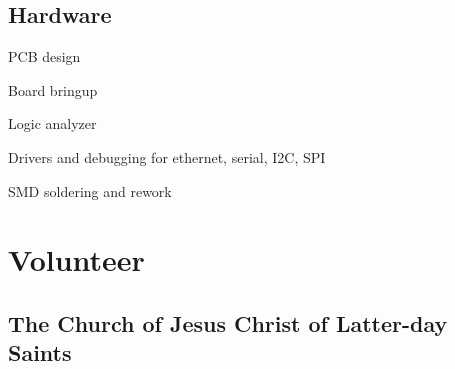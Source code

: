 \documentclass[letterpaper]{deedy-resume} %
\begin{document}
\begin{minipage}[t]{0.28\textwidth}
\sectionspace

\subsection{Hardware}

\vspace{\topsep} %
\begin{tightitemize}
\item PCB design
\item Board bringup
\item Logic analyzer
\item Drivers and debugging for ethernet, serial, I2C, SPI
\item SMD soldering and rework
\end{tightitemize}


\sectionspace %

%
%
%


\section{Volunteer}

\subsection{The Church of Jesus Christ of
  Latter-day Saints}


\end{minipage}
\end{document}
